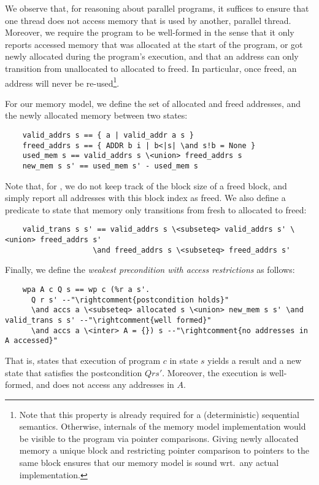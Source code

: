 \documentclass[runningheads]{llncs}
\begin{document}
  We observe that, for reasoning about parallel programs, it suffices to ensure that one thread does not access memory that is used by another, parallel thread.
  Moreover, we require the program to be
  well-formed in the sense that it only reports accessed memory that was allocated at the start
  of the program, or got newly allocated during the program's execution, and that an address can
  only transition from unallocated to allocated to freed. In particular, once freed, an address
  will never be re-used\footnote{Note that this property is already required for a (deterministic)
  sequential semantics. Otherwise, internals of the memory model implementation would be visible
  to the program via pointer comparisons. Giving newly allocated memory a unique block
  and restricting pointer comparison to pointers to the same block ensures that our memory model is
  sound wrt.\ any actual implementation.}.

  For our memory model, we define the set of allocated and freed addresses, and the newly
  allocated memory between two states:
  \begin{lstlisting}
    valid_addrs s == { a | valid_addr a s }
    freed_addrs s == { ADDR b i | b<|s| \and s!b = None }
    used_mem s == valid_addrs s \<union> freed_addrs s
    new_mem s s' == used_mem s' - used_mem s
  \end{lstlisting}
  Note that, for , we do not keep track of the block size of a freed block, and simply report all addresses with this block index as freed.
  We also define a predicate to state that memory only transitions from fresh to allocated to freed:
  \begin{lstlisting}
    valid_trans s s' == valid_addrs s \<subseteq> valid_addrs s' \<union> freed_addrs s'
                    \and freed_addrs s \<subseteq> freed_addrs s'
  \end{lstlisting}
  Finally, we define the \emph{weakest precondition with access restrictions} as follows:
  \begin{lstlisting}
    wpa A c Q s == wp c (%r a s'.
      Q r s' --"\rightcomment{postcondition holds}"
      \and accs a \<subseteq> allocated s \<union> new_mem s s' \and valid_trans s s' --"\rightcomment{well formed}"
      \and accs a \<inter> A = {}) s --"\rightcomment{no addresses in A accessed}"
  \end{lstlisting}
  That is,  states that execution of program $c$ in state $s$ yields a result  and a new
  state  that satisfies the postcondition \is$Q r s'$. Moreover, the execution is well-formed,
  and does not access any addresses in $A$.
\end{document}
